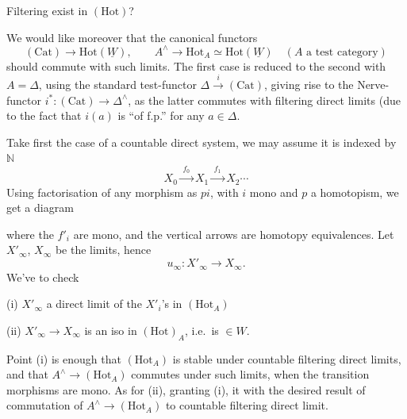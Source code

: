 \documentclass[11pt,a4paper]{article}
\begin{document}
Filtering  exist in $(\mathrm{Hot})$?

We would like moreover that  the canonical functors
\[
(\mathrm{Cat}) \longrightarrow \mathrm{Hot}(\underline{W}), \qquad
A^{\wedge} \longrightarrow \mathrm{Hot}_A \simeq \mathrm{Hot}(\underline{W})
\quad (A \text{ a test category})
\]
should commute with such limits. The first case is reduced to the second
with $A = \Delta$, using the standard test-functor $\Delta
\xrightarrow{\;i\;} (\mathrm{Cat})$, giving rise to the Nerve-functor
$i^{*} : (\mathrm{Cat}) \to \Delta^{\wedge}$, as the latter commutes with
filtering direct limits (due to the fact that $i(a)$ is ``of f.p.'' for
any $a \in \Delta$.

Take first the case of a countable direct system, we may assume it is
indexed by $\mathbb{N}$
\[
X_0 \xrightarrow{\;f_0\;} X_1 \xrightarrow{\;f_1\;} X_2 \cdots
\]
Using factorisation of any morphism as $pi$, with $i$ mono and $p$ a
homotopism, we get a diagram


where the $f'_i$ are mono, and the vertical arrows are homotopy
equivalences. Let $X'_\infty$, $X_\infty$ be the limits, hence
\[
u_\infty : X'_\infty \longrightarrow X_\infty .
\]
We've to check

(i) $X'_\infty$ \struck{\ill{}} a direct limit of the $X'_i$'s in
$(\mathrm{Hot}_A)$

(ii) $X'_\infty \to X_\infty$ is an iso in $(\mathrm{Hot})_A$, i.e.\ is
\struck{\ill{}} $\in W$.


Point (i) is enough \struck{\ill{}}  that
$(\mathrm{Hot}_A)$ is stable under countable filtering direct limits, and
that $A^{\wedge} \to (\mathrm{Hot}_A)$ commutes \struck{\ill{}} under
 such limits, when the transition morphisms are mono.
\struck{\ill{}} As for (ii), granting (i), it 
 with the desired result of commutation of $A^{\wedge} \to
(\mathrm{Hot}_A)$ to countable filtering direct limit.
\end{document}
